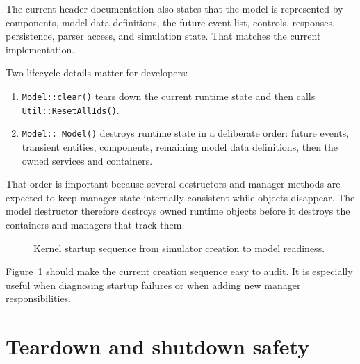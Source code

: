 The current header documentation also states that the model is represented by
components, model-data definitions, the future-event list, controls, responses,
persistence, parser access, and simulation state. That matches the current
implementation.

Two lifecycle details matter for developers:
\begin{enumerate}
\item \texttt{Model::clear()} tears down the current runtime state and then
calls \texttt{Util::ResetAllIds()}.
\item \texttt{Model::~Model()} destroys runtime state in a deliberate order:
future events, transient entities, components, remaining model data
definitions, then the owned services and containers.
\end{enumerate}

That order is important because several destructors and manager methods are
expected to keep manager state internally consistent while objects disappear.
The model destructor therefore destroys owned runtime objects before it destroys
the containers and managers that track them.

\begin{figure}[htbp]
\centering
\caption{Kernel startup sequence from simulator creation to model readiness.}
\label{fig:kernel-startup-sequence}
\end{figure}

Figure~\ref{fig:kernel-startup-sequence} should make the current creation
sequence easy to audit. It is especially useful when diagnosing startup
failures or when adding new manager responsibilities.

\section{Teardown and shutdown safety}
\label{sec:teardown-shutdown-safety}

